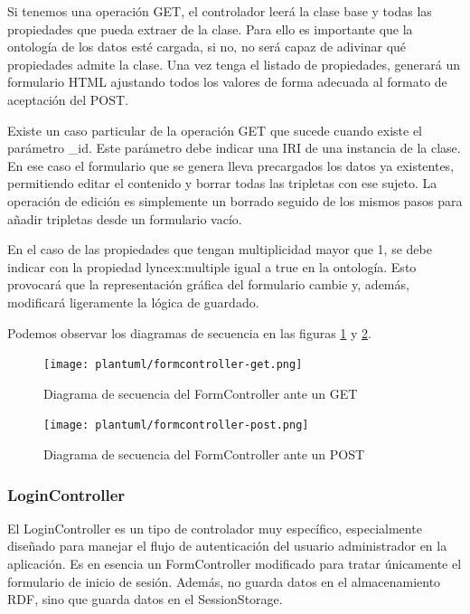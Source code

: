 \documentclass[openright,twoside,12pt]{book}
\begin{document}
Si tenemos una operación GET, el controlador leerá la clase base y todas las propiedades que pueda extraer de la clase. Para ello es importante que la ontología de los datos esté cargada, si no, no será capaz de adivinar qué propiedades admite la clase.
Una vez tenga el listado de propiedades, generará un formulario HTML ajustando todos los valores de forma adecuada al formato de aceptación del POST.

Existe un caso particular de la operación GET que sucede cuando existe el parámetro \_id. Este parámetro debe indicar una IRI de una instancia de la clase. En ese caso el formulario que se genera lleva precargados los datos ya existentes, permitiendo editar el contenido y borrar todas las tripletas con ese sujeto. La operación de edición es simplemente un borrado seguido de los mismos pasos para añadir tripletas desde un formulario vacío.

En el caso de las propiedades que tengan multiplicidad mayor que 1, se debe indicar con la propiedad lyncex:multiple igual a true en la ontología. Esto provocará que la representación gráfica del formulario cambie y, además, modificará ligeramente la lógica de guardado.

Podemos observar los diagramas de secuencia en las figuras \ref{fig:formcontrollerget} y \ref{fig:formcontrollerpost}.

\begin{figure}
    \centering
    \texttt{[image: plantuml/formcontroller-get.png]}
    \caption{Diagrama de secuencia del FormController ante un GET}
    \label{fig:formcontrollerget}
\end{figure}

\begin{figure}
    \centering
    \texttt{[image: plantuml/formcontroller-post.png]}
    \caption{Diagrama de secuencia del FormController ante un POST}
    \label{fig:formcontrollerpost}
\end{figure}

\subsubsection{LoginController}

El LoginController es un tipo de controlador muy específico, especialmente diseñado para manejar el flujo de autenticación del usuario administrador en la aplicación. Es en esencia un FormController modificado para tratar únicamente el formulario de inicio de sesión. Además, no guarda datos en el almacenamiento RDF, sino que guarda datos en el SessionStorage. 
\end{document}
